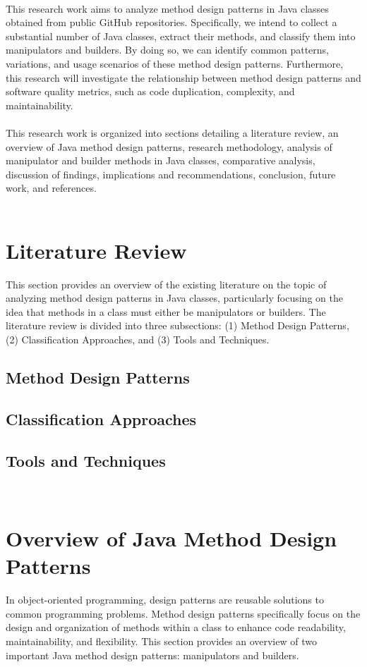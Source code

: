 \documentclass[draft]{article}
\begin{document}
~\\
This research work aims to analyze method design patterns in Java classes obtained from public GitHub repositories. Specifically, we intend to collect a substantial number of Java classes, extract their methods, and classify them into manipulators and builders. By doing so, we can identify common patterns, variations, and usage scenarios of these method design patterns. Furthermore, this research will investigate the relationship between method design patterns and software quality metrics, such as code duplication, complexity, and maintainability.\\
~\\
This research work is organized into sections detailing a literature review, an overview of Java method design patterns, research methodology, analysis of manipulator and builder methods in Java classes, comparative analysis, discussion of findings, implications and recommendations, conclusion, future work, and references.\\
~\\

\newpage
\section{Literature Review}
This section provides an overview of the existing literature on the topic of analyzing method design patterns in Java classes, particularly focusing on the idea that methods in a class must either be manipulators or builders. The literature review is divided into three subsections: (1) Method Design Patterns, (2) Classification Approaches, and (3) Tools and Techniques.
\subsection{Method Design Patterns}
\subsection{Classification Approaches}
\subsection{Tools and Techniques}
~\\

\newpage
\section{Overview of Java Method Design Patterns}
In object-oriented programming, design patterns are reusable solutions to common programming problems. Method design patterns specifically focus on the design and organization of methods within a class to enhance code readability, maintainability, and flexibility. This section provides an overview of two important Java method design patterns: manipulators and builders.
\end{document}
